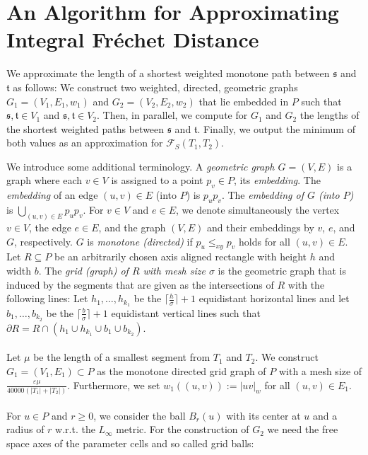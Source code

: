\documentclass[a4paper,11pt]{article}
\begin{document}
\section{An Algorithm for Approximating Integral Fr\'{e}chet Distance}\label{sec:pre}
We approximate the length of a shortest weighted monotone path between $\mathfrak{s}$ and $\mathfrak{t}$ as follows: We construct two weighted, directed, geometric graphs $G_1 = (V_1,E_1,w_1)$ and $G_2 = (V_2,E_2,w_2)$ that lie embedded in $P$ such that $\mathfrak{s},\mathfrak{t} \in V_1$ and $\mathfrak{s},\mathfrak{t} \in  V_2$. Then, in parallel, we compute for $G_1$ and $G_2$ the lengths of the shortest weighted paths between $\mathfrak{s}$ and $\mathfrak{t}$. Finally, we output the minimum of both values as an approximation for $\mathcal{F}_S(T_1,T_2)$.
	


We introduce some additional terminology. 	A \emph{geometric graph $G = (V,E)$} is a graph where each $v \in V$ is assigned to a point $p_v \in P$, its \emph{embedding}. The \emph{embedding} of an edge $(u,v) \in E$ (into $P$) is $p_{u}p_{v}$. The \emph{embedding of $G$ (into $P$)} is $\bigcup_{(u,v) \in E} p_up_v$. For $v \in V$ and $e \in E$, we denote simultaneously the vertex $v \in V$, the edge $e \in E$, and the graph $(V,E)$ and their embeddings by $v$, $e$, and $G$, respectively. $G$ is \emph{monotone (directed)} if $p_u \leq_{xy} p_v$ holds for all $(u,v) \in E$.  Let $R \subseteq P$ be an arbitrarily chosen axis aligned rectangle with height $h$ and width $b$. The \emph{grid (graph) of $R$ with mesh size $\sigma$} is the geometric graph that is induced by the segments that are given as the intersections of $R$ with the following lines: Let $h_1, \dots,h_{k_1}$ be the $\lceil \frac{h}{\sigma} \rceil+1$ equidistant horizontal lines and let $b_1, \dots,b_{k_2}$ be the $\lceil \frac{b}{\sigma} \rceil+1$ equidistant vertical lines such that $\partial R = R \cap (h_1 \cup h_{k_1} \cup b_1 \cup b_{k_2})$. \\ \\
  Let $\mu$ be the length of a smallest segment from $T_1$ and $T_2$. We construct $G_1=(V_1,E_1) \subset P$ as the monotone directed grid graph of $P$ with a mesh size of $\frac{\varepsilon \mu}{40000 (|T_1| + |T_2|)}$. Furthermore, we set $w_1((u,v)):=|uv|_w$ for all $(u,v) \in E_1$.\\ \\
  For $u \in P$ and $r \geq 0$, we consider the ball $B_r(u)$ with its center at $u$ and a radius of $r$ w.r.t. the $L_{\infty}$ metric. 
For the construction of $G_2$ we need the free space axes of the parameter cells and so called grid balls:
\end{document}
